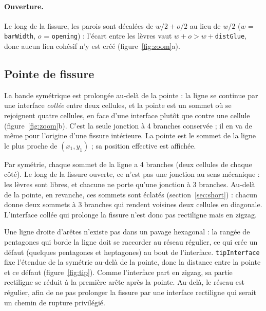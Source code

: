 \documentclass[11pt,a4paper]{article}
\newcommand{\code}[1]{\texttt{#1}}
\begin{document}
\paragraph{Ouverture.} Le long de la fissure, les parois sont décalées de $w/2+o/2$ au lieu de $w/2$
($w$ = \code{barWidth}, $o$ = \code{opening}) : l'écart entre les lèvres vaut $w+o>w+$\code{distGlue}, donc aucun
lien cohésif n'y est créé (figure~\ref{fig:zoom}a).

\subsection{Pointe de fissure}
\label{sec:tip}

La bande symétrique est prolongée au-delà de la pointe : la ligne se continue par une interface \emph{collée}
entre deux cellules, et la pointe est un sommet où se rejoignent quatre cellules, en face d'une interface plutôt
que contre une cellule (figure~\ref{fig:zoom}b). C'est la seule jonction à 4 branches conservée ; il en va de même
pour l'origine d'une fissure intérieure. La pointe est le sommet de la ligne le plus proche de $(x_1,y_1)$ ; sa
position effective est affichée.

Par symétrie, chaque sommet de la ligne a 4 branches (deux cellules de chaque côté). Le long de la fissure ouverte,
ce n'est pas une jonction au sens mécanique : les lèvres sont libres, et chacune ne porte qu'une jonction à 3
branches. Au-delà de la pointe, en revanche, ces sommets sont éclatés (section~\ref{sec:short}) : chacun donne deux
sommets à 3 branches qui rendent voisines deux cellules en diagonale. L'interface collée qui prolonge la fissure
n'est donc pas rectiligne mais en zigzag.

Une ligne droite d'arêtes n'existe pas dans un pavage hexagonal : la rangée de pentagones qui borde la ligne doit se
raccorder au réseau régulier, ce qui crée un défaut (quelques pentagones et heptagones) au bout de l'interface.
\code{tipInterface} fixe l'étendue de la symétrie au-delà de la pointe, donc la distance entre la pointe et
ce défaut (figure~\ref{fig:tip}). Comme l'interface part en zigzag, sa partie rectiligne se réduit à la première
arête après la pointe. Au-delà, le réseau est régulier, afin de ne pas prolonger la fissure par une interface
rectiligne qui serait un chemin de rupture privilégié.
\end{document}

